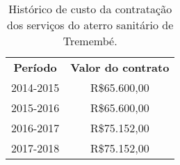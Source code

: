\begin{table}[htbp]
  \centering
  \caption{Histórico de custo da contratação dos serviços do aterro sanitário de Tremembé.}
    \begin{tabular}{c|c}
    \rowcolor[rgb]{ .969,  .588,  .275} \textcolor[rgb]{ 1,  1,  1}{\textbf{Período}} & \textcolor[rgb]{ 1,  1,  1}{\textbf{Valor do contrato}} \\
    \rowcolor[rgb]{ .992,  .914,  .851} 2014-2015 & R\$65.600,00 \\
    \rowcolor[rgb]{ .984,  .831,  .706} 2015-2016 & R\$65.600,00 \\
    \rowcolor[rgb]{ .992,  .914,  .851} 2016-2017 & R\$75.152,00 \\
    \rowcolor[rgb]{ .984,  .831,  .706} 2017-2018 & R\$75.152,00 \\
    \end{tabular}%
  \label{tab:custo_aterro}%
\end{table}%
